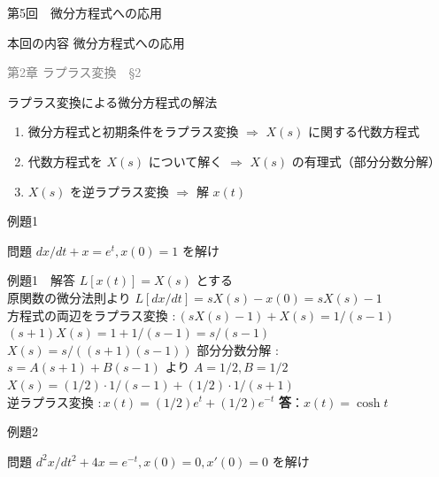 \documentclass[professionalfonts]{beamer}
\begin{document}
\begin{frame}{第5回　微分方程式への応用}
  \begin{block}{本回の内容}
  微分方程式への応用
  \end{block}
  \vfill\hfill{\scriptsize \textcolor{gray}{第2章 ラプラス変換　§2}}
\end{frame}

\begin{frame}{ラプラス変換による微分方程式の解法}
  \begin{block}{}
  \begin{enumerate}[Step 1.]
    \item 微分方程式と初期条件をラプラス変換
    $\Rightarrow$ $X(s)$ に関する代数方程式\\
    \item 代数方程式を $X(s)$ について解く
    $\Rightarrow$ $X(s)$ の有理式（部分分数分解）\\
    \item $X(s)$ を逆ラプラス変換
    $\Rightarrow$ 解 $x(t)$\\
  \end{enumerate}
  \end{block}
\end{frame}

\begin{frame}{例題1}
  \begin{exampleblock}{問題}
    $dx/dt + x = e^t, x(0) = 1$ を解け\\[2pt]
  \end{exampleblock}
\end{frame}

\begin{frame}{例題1　解答}
  $L[x(t)] = X(s)$ とする\\[4pt]
  原関数の微分法則より $L[dx/dt] = sX(s) - x(0) = sX(s) - 1$\\[4pt]
  方程式の両辺をラプラス変換 $: (sX(s) - 1) + X(s) = 1/(s-1)$\\[4pt]
  $(s+1)X(s) = 1 + 1/(s-1) = s/(s-1)$\\[4pt]
  $X(s) = s/((s+1)(s-1))$ 部分分数分解 :\\[4pt]
  $s = A(s+1) + B(s-1)$ より $A = 1/2, B = 1/2$\\[4pt]
  $X(s) = (1/2)\cdot1/(s-1) + (1/2)\cdot1/(s+1)$\\[4pt]
  逆ラプラス変換 $: x(t) = (1/2)e^t + (1/2)e^{-t}$
  \medskip\textbf{答}：$x(t) = \cosh t$
\end{frame}

\begin{frame}{例題2}
  \begin{exampleblock}{問題}
    $d^{2}x/dt^{2} + 4x = e^{-t}, x(0) = 0, x'(0) = 0$ を解け\\[2pt]
  \end{exampleblock}
\end{frame}
\end{document}

